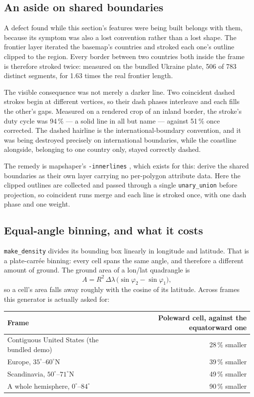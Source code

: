 \documentclass[11pt]{article}
\begin{document}
\subsection{An aside on shared boundaries}
\label{sec:shared-boundaries}

A defect found while this section's features were being built belongs
with them, because its symptom was also a lost convention rather than a
lost shape. The frontier layer iterated the basemap's countries and
stroked each one's outline clipped to the region. Every border between
two countries both inside the frame is therefore stroked twice: measured
on the bundled Ukraine plate, 506 of 783 distinct segments, for 1.63
times the real frontier length.

The visible consequence was not merely a darker line. Two coincident
dashed strokes begin at different vertices, so their dash phases
interleave and each fills the other's gaps. Measured on a rendered crop
of an inland border, the stroke's duty cycle was 94\,\% --- a solid line
in all but name --- against 51\,\% once corrected. The dashed hairline is
the international-boundary convention, and it was being destroyed
precisely on international boundaries, while the coastline alongside,
belonging to one country only, stayed correctly dashed.

The remedy is mapshaper's \texttt{-innerlines} \cite{mapshaper}, which
exists for this: derive the shared boundaries as their own layer carrying
no per-polygon attribute data. Here the clipped outlines are collected
and passed through a single \texttt{unary\_union} before projection, so
coincident runs merge and each line is stroked once, with one dash phase
and one weight.

\subsection{Equal-angle binning, and what it costs}
\label{sec:equal-angle}

\texttt{make\_density} divides its bounding box linearly in longitude and
latitude. That is a plate-carr\'ee binning: every cell spans the same
angle, and therefore a different amount of ground. The ground area of a
lon/lat quadrangle is
\[
A = R^{2}\,\Delta\lambda\,\bigl(\sin\varphi_{2} - \sin\varphi_{1}\bigr),
\]
so a cell's area falls away roughly with the cosine of its latitude.
Across frames this generator is actually asked for:

\begin{center}
\begin{tabular}{lr}
\toprule
Frame & Poleward cell, against the equatorward one \\
\midrule
Contiguous United States (the bundled demo) & 28\,\% smaller \\
Europe, $35^\circ$--$60^\circ$N & 39\,\% smaller \\
Scandinavia, $50^\circ$--$71^\circ$N & 49\,\% smaller \\
A whole hemisphere, $0^\circ$--$84^\circ$ & 90\,\% smaller \\
\bottomrule
\end{tabular}
\end{center}
\end{document}
